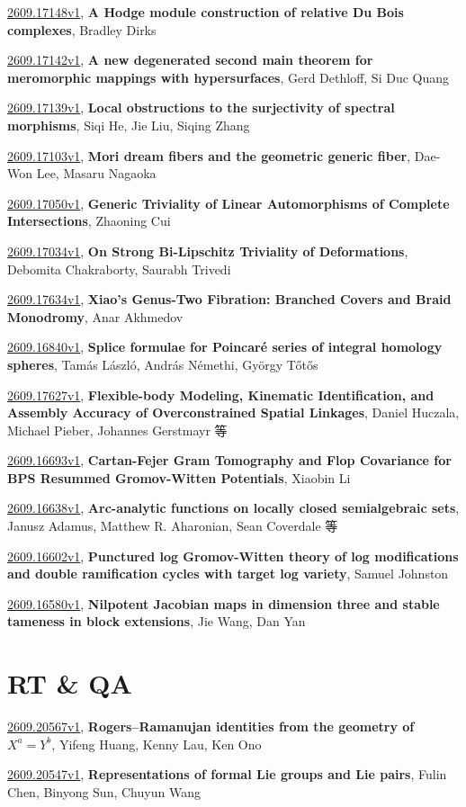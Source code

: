 \documentclass[9pt, a4paper]{article}
\theoremstyle{plain}
\theoremstyle{definition}
\theoremstyle{remark}
\newcommand{\arxiv}[3]{\href{https://arxiv.org/abs/#1}{#1}, \textbf{\textcolor{arxivblue}{#2}}, #3}
\begin{document}
\arxiv{2609.17148v1}{A Hodge module construction of relative Du Bois complexes}{Bradley Dirks}

\arxiv{2609.17142v1}{A new degenerated second main theorem for meromorphic mappings with hypersurfaces}{Gerd Dethloff, Si Duc Quang}

\arxiv{2609.17139v1}{Local obstructions to the surjectivity of spectral morphisms}{Siqi He, Jie Liu, Siqing Zhang}

\arxiv{2609.17103v1}{Mori dream fibers and the geometric generic fiber}{Dae-Won Lee, Masaru Nagaoka}

\arxiv{2609.17050v1}{Generic Triviality of Linear Automorphisms of Complete Intersections}{Zhaoning Cui}

\arxiv{2609.17034v1}{On Strong Bi-Lipschitz Triviality of Deformations}{Debomita Chakraborty, Saurabh Trivedi}

\arxiv{2609.17634v1}{Xiao's Genus-Two Fibration: Branched Covers and Braid Monodromy}{Anar Akhmedov}

\arxiv{2609.16840v1}{Splice formulae for Poincaré series of integral homology spheres}{Tamás László, András Némethi, György Tőtős}

\arxiv{2609.17627v1}{Flexible-body Modeling, Kinematic Identification, and Assembly Accuracy of Overconstrained Spatial Linkages}{Daniel Huczala, Michael Pieber, Johannes Gerstmayr 等}

\arxiv{2609.16693v1}{Cartan-Fejer Gram Tomography and Flop Covariance for BPS Resummed Gromov-Witten Potentials}{Xiaobin Li}

\arxiv{2609.16638v1}{Arc-analytic functions on locally closed semialgebraic sets}{Janusz Adamus, Matthew R. Aharonian, Sean Coverdale 等}

\arxiv{2609.16602v1}{Punctured log Gromov-Witten theory of log modifications and double ramification cycles with target log variety}{Samuel Johnston}

\arxiv{2609.16580v1}{Nilpotent Jacobian maps in dimension three and stable tameness in block extensions}{Jie Wang, Dan Yan}


\section{RT \& QA}
\arxiv{2609.20567v1}{Rogers--Ramanujan identities from the geometry of $X^a=Y^b$}{Yifeng Huang, Kenny Lau, Ken Ono}

\arxiv{2609.20547v1}{Representations of formal Lie groups and Lie pairs}{Fulin Chen, Binyong Sun, Chuyun Wang}
\end{document}
